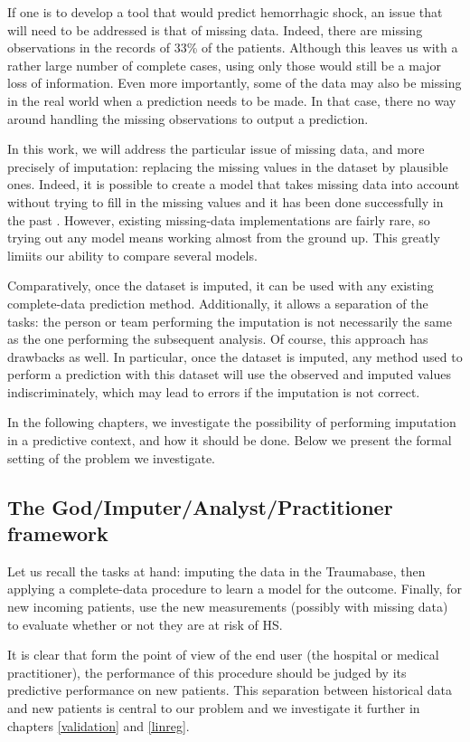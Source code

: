 If one is to develop a tool that would predict hemorrhagic shock, an issue that will need to be addressed is that of missing data. Indeed, there are missing observations in the records of 33\% of the patients. Although this leaves us with a rather large number of complete cases, using only those would still be a major loss of information. Even more importantly, some of the data may also be missing in the real world when a prediction needs to be made. In that case, there no way around handling the missing observations to output a prediction.

In this work, we will address the particular issue of missing data, and more precisely of imputation: replacing the missing values in the dataset by plausible ones. Indeed, it is possible to create a model that takes missing data into account without trying to fill in the missing values and it has been done successfully in the past \cite{schafer2002missing}. However, existing missing-data implementations are fairly rare, so trying out any model means working almost from the ground up. This greatly limiits our ability to compare several models.

Comparatively, once the dataset is imputed, it can be used with any existing complete-data prediction method. Additionally, it allows a separation of the tasks: the person or team performing the imputation is not necessarily the same as the one performing the subsequent analysis. Of course, this approach has drawbacks as well. In particular, once the dataset is imputed, any method used to perform a prediction with this dataset will use the observed and imputed values indiscriminately, which may lead to errors if the imputation is not correct.

 In the following chapters, we investigate the possibility of performing imputation in a predictive context, and how it should be done. Below we present the formal setting of the problem we investigate.
 
		\subsection{The God/Imputer/Analyst/Practitioner framework}
		\label{framework}
Let us recall the tasks at hand: imputing the data in the Traumabase, then applying a complete-data procedure to learn a model for the outcome. Finally, for new  incoming patients, use the new measurements (possibly with missing data) to evaluate whether or not they are at risk of HS. 

It is clear that form the point of view of the end user (the hospital or medical practitioner), the performance of this procedure should be judged by its predictive performance on new patients. This separation between historical data and new patients is central to our problem and we investigate it further in chapters \ref{validation} and \ref{linreg}.


